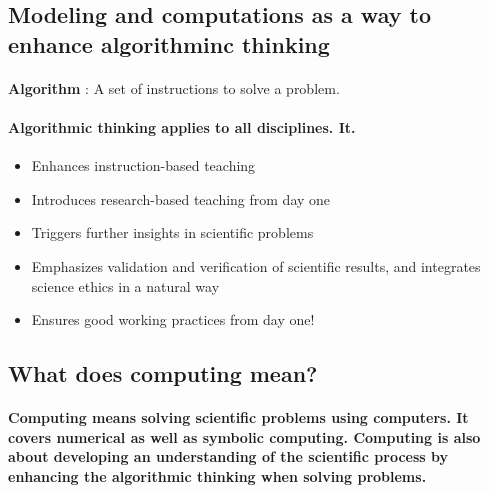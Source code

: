 \documentclass[%
twoside,                 %
final,                   %
10pt]{article}
\begin{document}
\noindent



\subsection*{Modeling and computations as a way to enhance algorithminc thinking}


\paragraph{}
\textbf{Algorithm} :
A set of instructions to solve a problem.




\paragraph{Algorithmic thinking applies to all disciplines. It.}
\begin{itemize}
\item Enhances instruction-based teaching

\item Introduces research-based teaching  from day one

\item Triggers further insights in scientific problems

\item Emphasizes validation and verification of scientific results, and integrates science ethics in a natural way

\item Ensures good working practices from day one!
\end{itemize}

\noindent





\subsection*{What does computing mean?}


\paragraph{}

\textbf{Computing means solving scientific problems using computers. It covers numerical as well as symbolic computing. Computing is also about developing an understanding of the scientific process by enhancing the algorithmic thinking when solving problems.}
\end{document}
